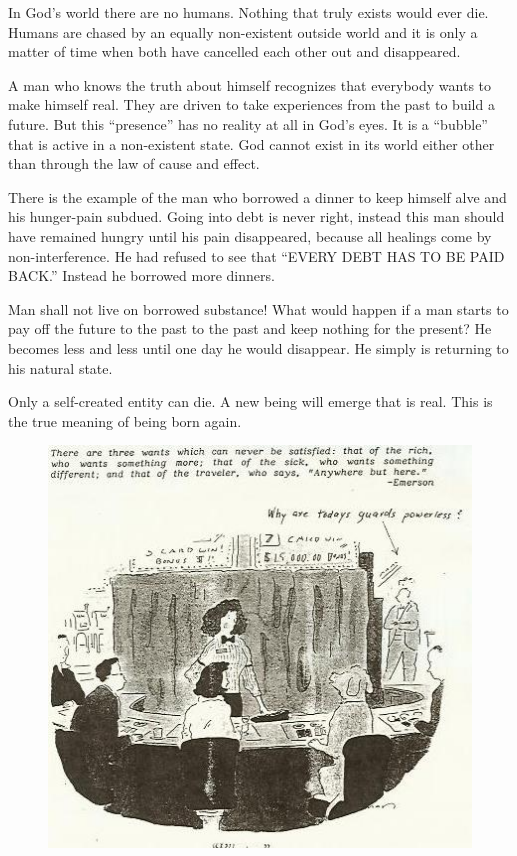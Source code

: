 \documentclass[landscape,twocolumn,letterpaper]{article}
\begin{document}
In God's world there are no humans. Nothing that truly exists would
ever die. Humans are chased by an equally non-existent outside world
and it is only a matter of time when both have cancelled each other
out and disappeared.

A man who knows the truth about himself recognizes that everybody
wants to make himself real. They are driven to take experiences from
the past to build a future. But this ``presence'' has no reality at
all in God's eyes. It is a ``bubble'' that is active in a non-existent
state. God cannot exist in its world either other than through the law
of cause and effect.



There is the example of the man who borrowed a dinner to keep himself
alve and his hunger-pain subdued. Going into debt is never right,
instead this man should have remained hungry until his pain
disappeared, because all healings come by non-interference. He had
refused to see that ``EVERY DEBT HAS TO BE PAID BACK.'' Instead he
borrowed more dinners.

Man shall not live on borrowed substance! What would happen if a man
starts to pay off the future to the past to the past and keep nothing
for the present? He becomes less and less until one day he would
disappear. He simply is returning to his natural state.

Only a self-created entity can die. A new being will emerge that is
real. This is the true meaning of being born again.



\begin{figure} \centering
  \includegraphics[height=0.4\textheight,bb= 0 0 427 406]{p30.jpg}
\end{figure}
\end{document}
